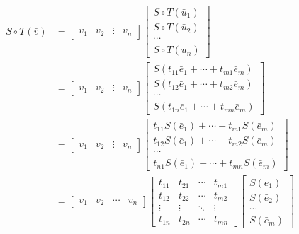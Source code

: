 \begin{commentary}
\begin{align*}
	S \circ T(\bar{v}) & =  \begin{bmatrix} v_1 & v_2 & \vdots & v_n  \end{bmatrix} \begin{bmatrix} S \circ T(\bar{u}_1) \\ S \circ T(\bar{u}_2) \\ \cdots \\ S \circ T(\bar{u}_n) \end{bmatrix} \\
	& =  \begin{bmatrix} v_1 & v_2 & \vdots & v_n  \end{bmatrix}\begin{bmatrix} S(t_{11}\bar{e}_1 + \cdots + t_{m1}\bar{e}_m) \\ S(t_{12}\bar{e}_1 + \cdots + t_{m2}\bar{e}_m) \\ \cdots \\ S(t_{1n}\bar{e}_1 + \cdots + t_{mn}\bar{e}_m) \end{bmatrix} \\
	& =  \begin{bmatrix} v_1 & v_2 & \vdots & v_n  \end{bmatrix}\begin{bmatrix} t_{11}S(\bar{e}_1) + \cdots + t_{m1}S(\bar{e}_m) \\ t_{12}S(\bar{e}_1) + \cdots + t_{m2}S(\bar{e}_m) \\ \cdots \\ t_{n1}S(\bar{e}_1) + \cdots + t_{mn}S(\bar{e}_m) \end{bmatrix} \\
	& = \begin{bmatrix} v_1 & v_2 & \cdots & v_n  \end{bmatrix} \begin{bmatrix} t_{11} & t_{21} & \cdots & t_{m1} \\ t_{12} & t_{22} & \cdots & t_{m2} \\ \vdots & \vdots & \ddots & \vdots \\ t_{1n} & t_{2n} & \cdots & t_{mn} \end{bmatrix} \begin{bmatrix} S(\bar{e}_1) \\ S(\bar{e}_2) \\ \cdots \\ S(\bar{e}_m) \end{bmatrix} \\

\end{align*}
\end{commentary}
